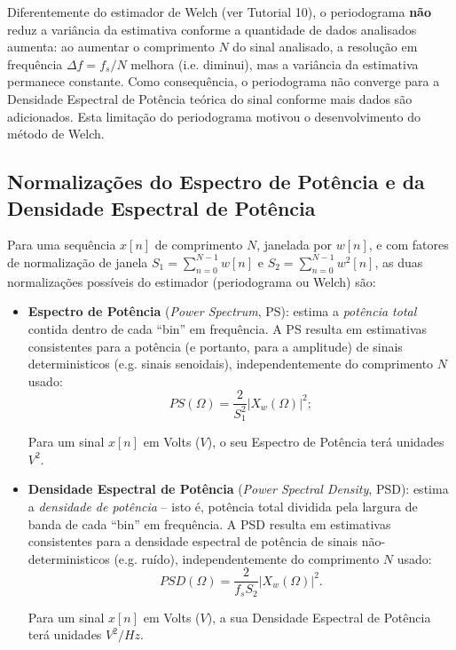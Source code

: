 \documentclass[a4paper,twoside,12pt]{article}
\begin{document}
	Diferentemente do estimador de Welch (ver Tutorial 10), o periodograma \textbf{não} reduz a variância da estimativa conforme a quantidade de dados analisados aumenta: ao aumentar o comprimento $N$ do sinal analisado, a resolução em frequência $\Delta f = f_s / N$ melhora (i.e. diminui), mas a variância da estimativa permanece constante. Como consequência, o periodograma não converge para a Densidade Espectral de Potência teórica do sinal conforme mais dados são adicionados. Esta limitação do periodograma motivou o desenvolvimento do método de Welch.
	
	\subsection{Normalizações do Espectro de Potência e da Densidade Espectral de Potência}
	
	Para uma sequência $x[n]$ de comprimento $N$, janelada por $w[n]$, e com fatores de normalização de janela $S_1 = \sum_{n=0}^{N-1} w[n]$ e $S_2 = \sum_{n=0}^{N-1} w^2[n]$, as duas normalizações possíveis do estimador (periodograma ou Welch) são:
	
	\begin{itemize}
		\item \textbf{Espectro de Potência} (\emph{Power Spectrum}, PS): estima a \emph{potência total} contida dentro de cada ``bin'' em frequência. A PS resulta em estimativas consistentes para a potência (e portanto, para a amplitude) de sinais deterministicos (e.g. sinais senoidais), independentemente do comprimento $N$ usado:
		\begin{equation}
			PS(\Omega) = \frac{2}{S_1^2} \left| X_w(\Omega) \right|^2;
		\end{equation}
		
		Para um sinal $x[n]$ em Volts ($V$), o seu Espectro de Potência terá unidades $V^2$.
		
		\item \textbf{Densidade Espectral de Potência} (\emph{Power Spectral Density}, PSD): estima a \emph{densidade de potência} -- isto é, potência total dividida pela largura de banda de cada ``bin'' em frequência. A PSD resulta em estimativas consistentes para a densidade espectral de potência de sinais não-deterministicos (e.g. ruído), independentemente do comprimento $N$ usado:
		\begin{equation}
			PSD(\Omega) = \frac{2}{f_s S_2} \left| X_w(\Omega) \right|^2.
		\end{equation}
		
		Para um sinal $x[n]$ em Volts ($V$), a sua Densidade Espectral de Potência terá unidades $V^2 / Hz$.
		
	\end{itemize}
	
\end{document}
